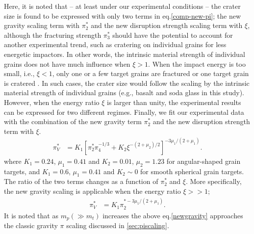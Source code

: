 \documentclass[3p,authoryear]{elsarticle}
\begin{document}
Here, it is noted that -- at least under our experimental conditions -- the crater size is found to be expressed with only two terms in eq.\eqref{comp-new-pi}; the new gravity scaling term with $\pi_2^*$ and the new disruption strength scaling term with $\xi$, although the fracturing strength $\pi_3^*$ should have the potential to account for another experimental trend, such as cratering on individual grains for less energetic impactors. In other words, the intrinsic material strength of individual grains does not have much influence when $\xi>1$. When the impact energy is too small, i.e., $\xi<1$, only one or a few target grains are fractured or one target grain is cratered \citep{guettler2012}. In such cases, the crater size would follow the scaling by the intrinsic material strength of individual grains (e.g., basalt and soda glass in this study). However, when the energy ratio $\xi$ is larger than unity, the experimental results can be expressed for two different regimes. Finally, we fit our experimental data with the combination of the new gravity term $\pi_2^*$ and the new disruption strength term with $\xi$.
\begin{align}
	\pi_V^*&=K_1\left[\pi_2^{*}\pi_4^{-1/3}+K_2\xi^{-(2+\mu_2)/2}\right]^{-3\mu_1/(2+\mu_1)}. \label{new-pi}
\end{align}
where $K_1=0.24 $, $\mu_1=0.41$ and $K_2=0.01$, $\mu_2=1.23$ for angular-shaped grain targets, and $K_1=0.6 $, $\mu_1=0.41$ and $K_2\sim 0$ for smooth spherical grain targets.
The ratio of the two terms changes as a function of $\pi_2^*$ and $\xi$. More specifically, the new gravity scaling is applicable when the energy ratio $\xi >>1$;
\begin{align}
	\pi_V^*&=K_1\pi_2^{*-3\mu_1/(2+\mu_1)}. \label{newgravity}
\end{align}
It is noted that as $m_p(\gg m_t)$ increases the above eq.\eqref{newgravity} approaches the classic gravity $\pi$ scaling discussed in \ref{sec:piscaling}.
\end{document}
